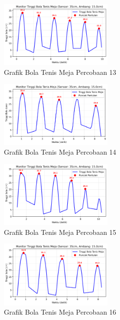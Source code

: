 \begin{figure}[htbp]
    \centering
    \includegraphics[width=0.5\textwidth]{chapters/DataPercobaan/Grafik_Bola_Tenis_Meja_13.png}
    \caption{Grafik Bola Tenis Meja Percobaan 13}
\end{figure}
\begin{figure}[htbp]
    \centering
    \includegraphics[width=0.5\textwidth]{chapters/DataPercobaan/Grafik_Bola_Tenis_Meja_14.png}
    \caption{Grafik Bola Tenis Meja Percobaan 14}
\end{figure}
\begin{figure}[htbp]
    \centering
    \includegraphics[width=0.5\textwidth]{chapters/DataPercobaan/Grafik_Bola_Tenis_Meja_15.png}
    \caption{Grafik Bola Tenis Meja Percobaan 15}
\end{figure}
\begin{figure}[htbp]
    \centering
    \includegraphics[width=0.5\textwidth]{chapters/DataPercobaan/Grafik_Bola_Tenis_Meja_16.png}
    \caption{Grafik Bola Tenis Meja Percobaan 16}
\end{figure}
